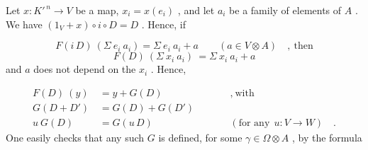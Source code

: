 \begin{center}
\end{center}
Let  $x : K'^{\,n} \rightarrow V$  be a map,  $x_{i} = x(e_{i})$  , and let  $a_{i}$  be a family of elements of  $A$  . We have  $(1_{V} + x) \circ i \circ D = D$  . Hence, if

\begin{equation*}
F(i\,D)\ (\Sigma\ e_{i}\ a_{i}) = \Sigma\ e_{i}\ a_{i} + a \qquad (a \in V \otimes A) \quad , \ \text{then}
\end{equation*}
\begin{equation*}
F(D)\ (\Sigma\ x_{i}\ a_{i}) \ = \Sigma\ x_{i}\ a_{i} + a
\end{equation*}
and  $a$  does not depend on the  $x_{i}$  . Hence,

\begin{equation*}
\begin{aligned}
F(D)\ (y) \ &= y + G(D) &&\qquad , \ \text{with} \\
G(D + D') &= G(D) + G(D') & \\
u\ G(D) \quad &= G(u\,D) &&\qquad (\text{for any} \ \ u : V \rightarrow W) \quad .
\end{aligned}
\end{equation*}
One easily checks that any such  $G$  is defined, for some  $\gamma \in \Omega \otimes A$  , by the formula

